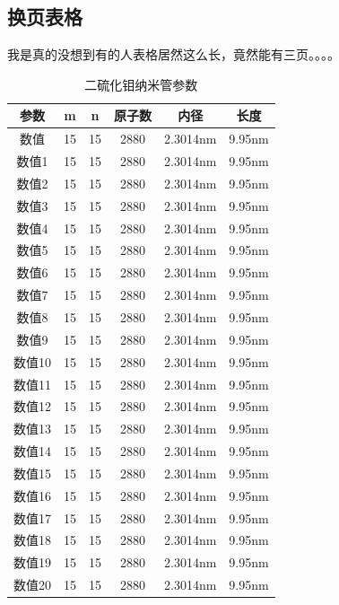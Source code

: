 \documentclass[AutoFakeBold]{LZUThesis2007}
\begin{document}
\subsection{换页表格} %

我是真的没想到有的人表格居然这么长，竟然能有三页。。。。


\begin{longtable}{cccccc} %
    \caption{二硫化钼纳米管参数}\label{tbl_mos2_nanotube}\\
    \toprule
    参数& m & n & 原子数 & 内径 & 长度\\
    \midrule
    数值 & 15 & 15  & 2880 & 2.3014nm & 9.95nm \\
    数值1 & 15 & 15  & 2880 & 2.3014nm & 9.95nm \\
    数值2 & 15 & 15  & 2880 & 2.3014nm & 9.95nm \\
    数值3 & 15 & 15  & 2880 & 2.3014nm & 9.95nm \\
    数值4 & 15 & 15  & 2880 & 2.3014nm & 9.95nm \\
    数值5 & 15 & 15  & 2880 & 2.3014nm & 9.95nm \\
    数值6 & 15 & 15  & 2880 & 2.3014nm & 9.95nm \\
    数值7 & 15 & 15  & 2880 & 2.3014nm & 9.95nm \\
    数值8 & 15 & 15  & 2880 & 2.3014nm & 9.95nm \\
    数值9 & 15 & 15  & 2880 & 2.3014nm & 9.95nm \\
    数值10 & 15 & 15  & 2880 & 2.3014nm & 9.95nm \\
    数值11 & 15 & 15  & 2880 & 2.3014nm & 9.95nm \\
    数值12 & 15 & 15  & 2880 & 2.3014nm & 9.95nm \\
    数值13 & 15 & 15  & 2880 & 2.3014nm & 9.95nm \\
    数值14 & 15 & 15  & 2880 & 2.3014nm & 9.95nm \\
    数值15 & 15 & 15  & 2880 & 2.3014nm & 9.95nm \\
    数值16 & 15 & 15  & 2880 & 2.3014nm & 9.95nm \\
    数值17 & 15 & 15  & 2880 & 2.3014nm & 9.95nm \\
    数值18 & 15 & 15  & 2880 & 2.3014nm & 9.95nm \\
    数值19 & 15 & 15  & 2880 & 2.3014nm & 9.95nm \\
    数值20 & 15 & 15  & 2880 & 2.3014nm & 9.95nm \\
    \bottomrule
\end{longtable}
\end{document}
